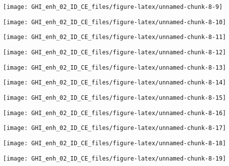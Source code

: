 \documentclass[
  10pt,
  a4paper,oneside]{article}
\begin{document}
\begin{center}\texttt{[image: GHI\_enh\_02\_ID\_CE\_files/figure-latex/unnamed-chunk-8-9]} \end{center}

\begin{center}\texttt{[image: GHI\_enh\_02\_ID\_CE\_files/figure-latex/unnamed-chunk-8-10]} \end{center}

\begin{center}\texttt{[image: GHI\_enh\_02\_ID\_CE\_files/figure-latex/unnamed-chunk-8-11]} \end{center}

\begin{center}\texttt{[image: GHI\_enh\_02\_ID\_CE\_files/figure-latex/unnamed-chunk-8-12]} \end{center}

\begin{center}\texttt{[image: GHI\_enh\_02\_ID\_CE\_files/figure-latex/unnamed-chunk-8-13]} \end{center}

\begin{center}\texttt{[image: GHI\_enh\_02\_ID\_CE\_files/figure-latex/unnamed-chunk-8-14]} \end{center}

\begin{center}\texttt{[image: GHI\_enh\_02\_ID\_CE\_files/figure-latex/unnamed-chunk-8-15]} \end{center}

\begin{center}\texttt{[image: GHI\_enh\_02\_ID\_CE\_files/figure-latex/unnamed-chunk-8-16]} \end{center}

\begin{center}\texttt{[image: GHI\_enh\_02\_ID\_CE\_files/figure-latex/unnamed-chunk-8-17]} \end{center}

\begin{center}\texttt{[image: GHI\_enh\_02\_ID\_CE\_files/figure-latex/unnamed-chunk-8-18]} \end{center}

\begin{center}\texttt{[image: GHI\_enh\_02\_ID\_CE\_files/figure-latex/unnamed-chunk-8-19]} \end{center}
\end{document}
